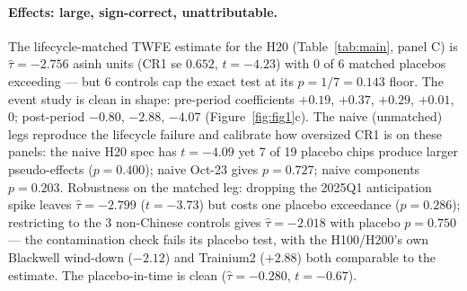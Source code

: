 \documentclass[11pt]{article}
\begin{document}
\paragraph{Effects: large, sign-correct, unattributable.} The
lifecycle-matched TWFE estimate for the H20 (Table~\ref{tab:main}, panel C)
is $\hat\tau=-2.756$ asinh units (CR1 se $0.652$, $t=-4.23$) with 0 of 6
matched placebos exceeding --- but 6 controls cap the exact test at its
$p=1/7=0.143$ floor. The event study is clean in shape: pre-period
coefficients $+0.19$, $+0.37$, $+0.29$, $+0.01$, $0$; post-period $-0.80$,
$-2.88$, $-4.07$ (Figure~\ref{fig:fig1}c). The naive (unmatched) legs
reproduce the lifecycle failure and calibrate how oversized CR1 is on these
panels: the naive H20 spec has $t=-4.09$ yet 7 of 19 placebo chips produce
larger pseudo-effects ($p=0.400$); naive Oct-23 gives $p=0.727$; naive
components $p=0.203$. Robustness on the matched leg: dropping the 2025Q1
anticipation spike leaves $\hat\tau=-2.799$ ($t=-3.73$) but costs one
placebo exceedance ($p=0.286$); restricting to the 3 non-Chinese controls
gives $\hat\tau=-2.018$ with placebo $p=0.750$ --- the contamination check
fails its placebo test, with the H100/H200's own Blackwell wind-down
($-2.12$) and Trainium2 ($+2.88$) both comparable to the estimate. The
placebo-in-time is clean ($\hat\tau=-0.280$, $t=-0.67$).
\end{document}
